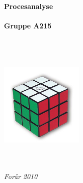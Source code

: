 \documentclass[a4paper]{article}
\begin{document}
\thispagestyle{empty}
\begin{center}        %
  \vspace{5mm}          %
  \LARGE
  \textbf{Procesanalyse} \\
  \Large
  \vspace{5mm}
  \textbf{ } \\
  \vspace{5mm}
  \large
  \textbf{Gruppe A215} \\
  \vspace{10mm}
  \Large
  {\bf{\textsl{ }}} \\
   \vspace{2mm}
  {\bf{\textsl{}}} \\
  \vspace{5mm}
  {\large \textsl {}}\\
  
  
  \vspace{10mm}
  \centerline{\includegraphics[width=4cm,height=4cm]{../Rapport/input/pics/rubiksCube.jpg}}
  \vspace{5mm}
  \textsl{} \\
  \textsl{} \\
  \vspace{10mm}
  \large
  \textsl{For\aa{}r 2010} \\
  \vspace{5mm}
  \normalsize
  \textsl{} \\
  \textsl{} \\
\end{center}

\ \pagebreak{}
\tableofcontents{}
\ \pagebreak{}

\pagebreak

\pagebreak

\pagebreak

\pagebreak

\end{document}
